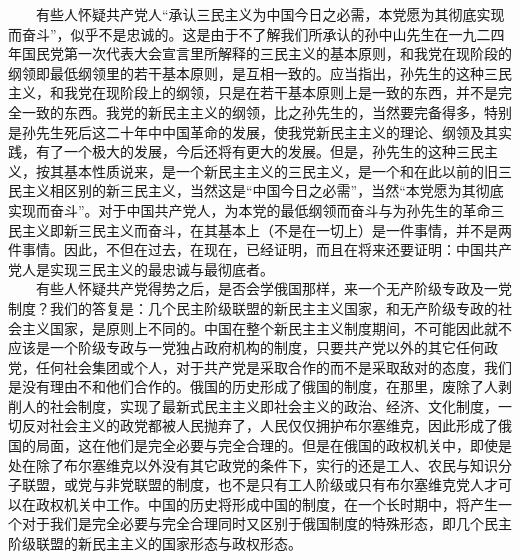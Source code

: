 \documentclass[cn,11pt,chinese]{elegantbook}
\begin{document}
　　有些人怀疑共产党人“承认三民主义为中国今日之必需，本党愿为其彻底实现而奋斗”，似乎不是忠诚的。这是由于不了解我们所承认的孙中山先生在一九二四年国民党第一次代表大会宣言里所解释的三民主义的基本原则，和我党在现阶段的纲领即最低纲领里的若干基本原则，是互相一致的。应当指出，孙先生的这种三民主义，和我党在现阶段上的纲领，只是在若干基本原则上是一致的东西，并不是完全一致的东西。我党的新民主主义的纲领，比之孙先生的，当然要完备得多，特别是孙先生死后这二十年中中国革命的发展，使我党新民主主义的理论、纲领及其实践，有了一个极大的发展，今后还将有更大的发展。但是，孙先生的这种三民主义，按其基本性质说来，是一个新民主主义的三民主义，是一个和在此以前的旧三民主义相区别的新三民主义，当然这是“中国今日之必需”，当然“本党愿为其彻底实现而奋斗”。对于中国共产党人，为本党的最低纲领而奋斗与为孙先生的革命三民主义即新三民主义而奋斗，在其基本上（不是在一切上）是一件事情，并不是两件事情。因此，不但在过去，在现在，已经证明，而且在将来还要证明：中国共产党人是实现三民主义的最忠诚与最彻底者。\\
　　有些人怀疑共产党得势之后，是否会学俄国那样，来一个无产阶级专政及一党制度？我们的答复是：几个民主阶级联盟的新民主主义国家，和无产阶级专政的社会主义国家，是原则上不同的。中国在整个新民主主义制度期间，不可能因此就不应该是一个阶级专政与一党独占政府机构的制度，只要共产党以外的其它任何政党，任何社会集团或个人，对于共产党是采取合作的而不是采取敌对的态度，我们是没有理由不和他们合作的。俄国的历史形成了俄国的制度，在那里，废除了人剥削人的社会制度，实现了最新式民主主义即社会主义的政治、经济、文化制度，一切反对社会主义的政党都被人民抛弃了，人民仅仅拥护布尔塞维克，因此形成了俄国的局面，这在他们是完全必要与完全合理的。但是在俄国的政权机关中，即使是处在除了布尔塞维克以外没有其它政党的条件下，实行的还是工人、农民与知识分子联盟，或党与非党联盟的制度，也不是只有工人阶级或只有布尔塞维克党人才可以在政权机关中工作。中国的历史将形成中国的制度，在一个长时期中，将产生一个对于我们是完全必要与完全合理同时又区别于俄国制度的特殊形态，即几个民主阶级联盟的新民主主义的国家形态与政权形态。\\
\end{document}
